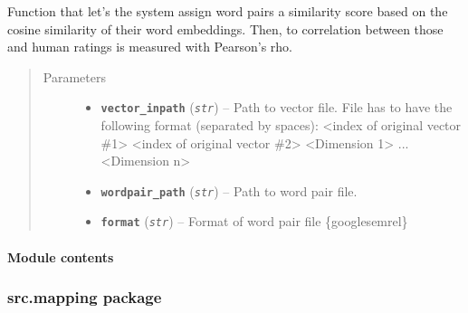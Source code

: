 \documentclass[letterpaper,10pt,english]{sphinxmanual}
\begin{document}

\begin{fulllineitems}
\label{src.eval:src.eval.word_similarity.word_sim_eval}
Function that let's the system assign word pairs a similarity score based on the cosine similarity of their word
embeddings. Then, to correlation between those and human ratings is measured with Pearson's rho.
\begin{quote}\begin{description}
\item[{Parameters}] \leavevmode\begin{itemize}
\item {} 
\textbf{\texttt{vector\_inpath}} (\emph{\texttt{str}}) -- Path to vector file. File has to have the following format (separated by spaces):
\textless{}index of original vector \#1\textgreater{} \textless{}index of original vector \#2\textgreater{} \textless{}Dimension 1\textgreater{} ... \textless{}Dimension n\textgreater{}

\item {} 
\textbf{\texttt{wordpair\_path}} (\emph{\texttt{str}}) -- Path to word pair file.

\item {} 
\textbf{\texttt{format}} (\emph{\texttt{str}}) -- Format of word pair file \{google\textbar{}semrel\}

\end{itemize}

\end{description}\end{quote}

\end{fulllineitems}



\paragraph{Module contents}
\label{src.eval:module-src.eval}\label{src.eval:module-contents}

\subsubsection{src.mapping package}
\label{src.mapping::doc}\label{src.mapping:src-mapping-package}
\end{document}
